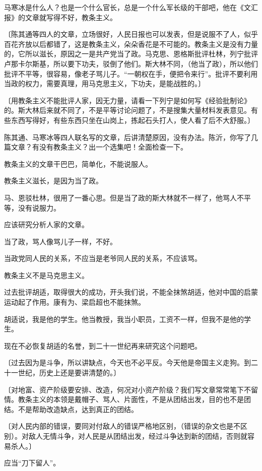 马寒冰是什么人？也是一个什么官长，总是一个什么军长级的干部吧，他在《文汇报》的文章就写得不好，教条主义。

〔陈其通等四人的文章，立场很好，人民日报也可以发表，但是说服不了人，似乎百花齐放以后都错了，这是教条主义，朵朵香花是不可能的。教条主义是没有力量的，它所以滋长，原因之一是共产党当了政。马克思、恩格斯批评杜林，列宁批评卢那卡尔斯基，所以要下功夫，驳倒了他们。斯大林不同，（他当了政），所以他们批评不平等，很容易，像老子骂儿子。“一朝权在手，便把令来行”。批评不要利用当政的权力，需要真理，用马克思主义，下功夫，是能战胜的。〕

〔用教条主义不能批评人家，因无力量，请看一下列宁是如何写《经验批制论》的。斯大林后来就不同了，不是平等讨论问题了，不是搜集大量材料发表意见。有些东西写得好，有些东西只坐在山岗上，拣起石头打人，使人看了后不大舒服。〕

陈其通、马寒冰等四人联名写的文章，后讲清楚原因，没有办法。陈沂，你写了几篇文章？有没有教条主义？出一个选集吧！全面检查一下。

教条主义的文章干巴巴，简单化，不能说服人。

教条主义滋长，是因为当了政。

马、恩驳杜林，很用了一番心思。但是当了政的斯大林就不一样了，他骂人不平等，没有说服力。

应该研究分析人家的文章。

当了政，骂人像骂儿子一样，不好。

当政党同人民的关系，不应当是老爷同人民的关系，不应该骂。

教条主义不是马克思主义。

过去批评胡适，取得很大的成功，开头我们说，不能全抹煞胡适，他对中国的启蒙运动起了作用。康有为、梁启超也不能抹煞。

胡适说，我是他的学生。他当教授，我当小职员，工资不一样，但我不是他的学生。

现在不必恢复胡适的名誉，到二十一世纪再来研究这个问题吧。

〔过去因为是斗争，所以讲缺点，今天也不必平反。今天他是帝国主义走狗。到二十一世纪，历史上还是要讲清楚的。〕

〔对地富、资产阶级要安排、改造，何况对小资产阶级？我们写文章常常笔下不留情。教条主义的本领是戴帽子、骂人、片面性，不是从团结出发，目的也不是团结。不是帮助改造缺点，达到真正的团结。

〔对人民内部的错误，要同对付敌人的错误严格地区别，（错误的杂文也是不区别）。对敌人无情斗争，对人民是从团结出发，经过斗争达到新的团结，否则就容易杀人。〕

应当“刀下留人”。


